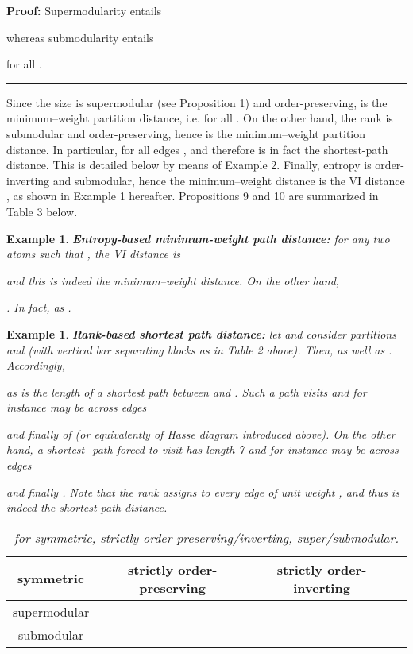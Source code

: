 \documentclass[a4paper,10pt]{article}
\newtheorem{example}[theorem]{Example}
\newenvironment{proof}[1][Proof]{\noindent\textbf{#1: }}{\ \rule{0.5em}{0.5em}}
\begin{document}
\begin{proof}
Supermodularity entails

whereas submodularity entails

for all .
\end{proof}

Since the size  is supermodular (see Proposition 1) and order-preserving,  is the minimum--weight partition distance, i.e.  for all . On the
other hand, the rank  is submodular \cite[pp. 259, 265, 274]{Aigner79} and order-preserving, hence  is the
minimum--weight partition distance. In particular,  for all edges , and therefore  is in fact the shortest-path distance. This
is detailed below by means of Example 2. Finally, entropy  is order-inverting and submodular, hence the minimum--weight distance  is the VI distance
, as shown in Example 1 hereafter. Propositions 9 and 10 are summarized in Table 3 below.

\begin{example}
\textbf{Entropy-based minimum-weight path distance:} for any two atoms  such that , the VI distance is

and this is indeed the minimum--weight distance. On the other hand,

. In fact,  as .
\end{example}

\begin{example}
\textbf{Rank-based shortest path distance:} let  and consider partitions  and  (with vertical bar  separating blocks as in Table
2 above). Then,  as well as . Accordingly,


as  is the length of a shortest path between  and . Such a path visits  and for instance may be across edges

and finally  of  (or equivalently of Hasse diagram  introduced above). On the other hand, a shortest -path \textit{forced to visit}
 has length 7 and for instance may be across edges


and finally . Note that the rank assigns to every edge  of  unit weight , and thus  is indeed the shortest path distance.
\end{example}

\begin{table}[htbp]
\caption{\textsl{ for  symmetric, strictly order preserving/inverting, super/submodular.}}
\label{tab: minimum-weight distances}
\begin{center}
\begin{tabular}{|c|c|c|c|}
\hline
 symmetric &  strictly order-preserving &  strictly order-inverting\\
\hline
 supermodular&  & \\
\hline
 submodular &  & \\
\hline
\end{tabular}
\end{center}
\end{table}
\end{document}

